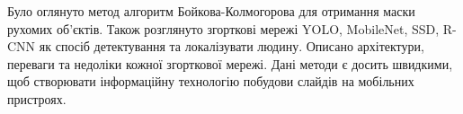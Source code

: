 \chapterConclusion

Було оглянуто метод алгоритм Бойкова-Колмогорова для
отримання маски рухомих об'єктів. Також розглянуто
згорткові мережі YOLO, MobileNet, SSD, R-CNN
як спосіб детектування та локалізувати людину. 
Описано архітектури, переваги та недоліки кожної 
згорткової мережі.
Дані методи є досить швидкими, щоб 
створювати інформаційну технологію побудови слайдів на 
мобільних пристроях.